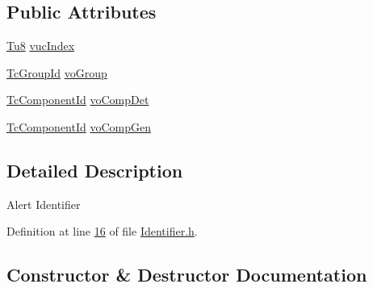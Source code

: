 \subsection*{Public Attributes}
\begin{DoxyCompactItemize}
\item 
\mbox{\hyperlink{namespace_g_n_common_a7939e251ddbf5d3a31832dcfdc8bde39}{Tu8}} \mbox{\hyperlink{class_g_n_common_1_1_g_n_notification_1_1_g_tc_identifier_a16810ad9a26866f6c408e59745b55b8e}{vuc\+Index}}
\item 
\mbox{\hyperlink{namespace_g_n_common_1_1_g_n_notification_af1f68a1b00e03ffcf38b56701fb86167}{Tc\+Group\+Id}} \mbox{\hyperlink{class_g_n_common_1_1_g_n_notification_1_1_g_tc_identifier_a78b2dec674749088b4fe661a9e26609f}{vo\+Group}}
\item 
\mbox{\hyperlink{namespace_g_n_common_1_1_g_n_notification_a24173724db4e769e5cf4bc03c70c34cd}{Tc\+Component\+Id}} \mbox{\hyperlink{class_g_n_common_1_1_g_n_notification_1_1_g_tc_identifier_a16951736dd13c129f4a7632285476625}{vo\+Comp\+Det}}
\item 
\mbox{\hyperlink{namespace_g_n_common_1_1_g_n_notification_a24173724db4e769e5cf4bc03c70c34cd}{Tc\+Component\+Id}} \mbox{\hyperlink{class_g_n_common_1_1_g_n_notification_1_1_g_tc_identifier_a456c1d9ad55bf0e31b8cca87cc1ce30e}{vo\+Comp\+Gen}}
\end{DoxyCompactItemize}


\subsection{Detailed Description}
Alert Identifier 

Definition at line \mbox{\hyperlink{_identifier_8h_source_l00016}{16}} of file \mbox{\hyperlink{_identifier_8h_source}{Identifier.\+h}}.



\subsection{Constructor \& Destructor Documentation}
\mbox{\label{class_g_n_common_1_1_g_n_notification_1_1_g_tc_identifier_a19d375f605d5f504d6c1b119916c474b}} 
